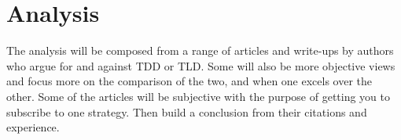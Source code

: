 \section{Analysis}
\label{section:analysis}
The analysis will be composed from a range of articles and write-ups by authors who argue for and against TDD or TLD. 
Some will also be more objective views and focus more on the comparison of the two, and when one excels over the other. 
Some of the articles will be subjective with the purpose of getting you to subscribe to one strategy. 
Then build a conclusion from their citations and experience.   












